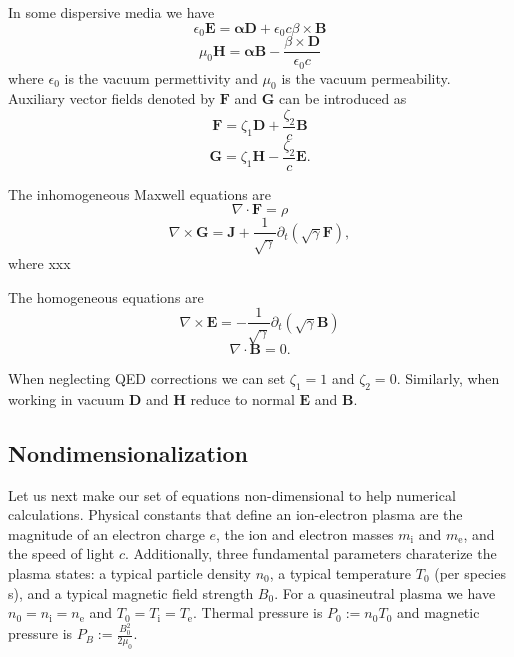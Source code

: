 \documentclass{aa}
\newcommand{\be}{\begin{equation}}
\newcommand{\ee}{\end{equation}}
\renewcommand{\vec}[1]{\ensuremath{\boldsymbol{#1}}}
\begin{document}
In some dispersive media we have
\be
\epsilon_0 \vec{E} = \vec{\alpha} \vec{D} + \epsilon_0 c \beta \times \vec{B}
\ee
\be
\mu_0 \vec{H} = \vec{\alpha} \vec{B} - \frac{\beta \times \vec{D}}{\epsilon_0 c}
\ee
where $\epsilon_0$ is the vacuum permettivity and $\mu_0$ is the vacuum permeability.
Auxiliary vector fields denoted by $\vec{F}$ and $\vec{G}$ can be introduced as
\be
\vec{F} = \zeta_1 \vec{D} + \frac{\zeta_2}{c} \vec{B}
\ee
\be
\vec{G} = \zeta_1 \vec{H} - \frac{\zeta_2}{c} \vec{E}.
\ee

The inhomogeneous Maxwell equations are
\be
\nabla \cdot \vec{F} = \rho
\ee
\be
\nabla \times \vec{G} = \vec{J} + \frac{1}{\sqrt{\gamma}} \partial_t (\sqrt{\gamma} \vec{F}),
\ee
where xxx

The homogeneous equations are
\be
\nabla \times \vec{E} = -\frac{1}{\sqrt{\gamma}} \partial_t (\sqrt{\gamma} \vec{B})\ee
\be
\nabla \cdot \vec{B} = 0.
\ee

When neglecting QED corrections we can set $\zeta_1=1$ and $\zeta_2=0$.
Similarly, when working in vacuum $\vec{D}$ and $\vec{H}$ reduce to normal $\vec{E}$ and $\vec{B}$.

\subsection{Nondimensionalization}
Let us next make our set of equations non-dimensional to help numerical calculations.
Physical constants that define an ion-electron plasma are the magnitude of an electron charge $e$, the ion and electron masses $m_{\mathrm{i}}$ and $m_{\mathrm{e}}$, and the speed of light $c$.
Additionally, three fundamental parameters charaterize the plasma states: a typical particle density $n_0$, a typical temperature $T_0$ (per species s), and a typical magnetic field strength $B_0$.
For a quasineutral plasma we have $n_0 = n_{\mathrm{i}} = n_{\mathrm{e}}$ and $T_0 = T_{\mathrm{i}} = T_{\mathrm{e}}$.
Thermal pressure is $P_0 := n_0 T_0$ and magnetic pressure is $P_B := \frac{B_0^2}{2 \mu_0}$.
\end{document}

